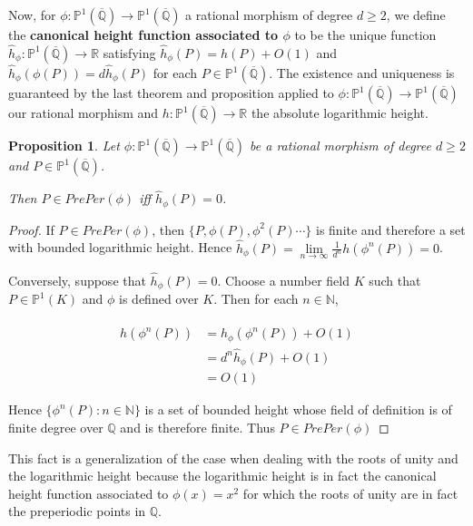 \documentclass{amsart}
\newtheorem{prop}[thm]{Proposition}
\newcommand{\R}{\mathbb{R}}
\newcommand{\N}{\mathbb{N}}
\newcommand{\Q}{\mathbb{Q}}
\renewcommand{\P}{\mathbb{P}}
\begin{document}
Now, for $\phi: \P^1(\overline{\Q}) \rightarrow \P^1(\overline{\Q})$ a rational morphism of degree $d \geq 2$, we define the \textbf{canonical height function associated to $\phi$} to be the unique function $\hat{h}_\phi: \P^1(\overline{\Q}) \rightarrow \R$ satisfying 
$\hat{h}_\phi(P) = h(P) + O(1)$ and $\hat{h}_\phi(\phi(P)) =  d\hat{h}_\phi(P)$ for each $P \in \P^1(\overline{\Q})$. The existence and 
uniqueness is guaranteed by the last theorem and proposition applied to $\phi: \P^1(\overline{\Q}) \rightarrow \P^1(\overline{\Q})$ our rational morphism and $h:\P^1(\overline{\Q}) \rightarrow \R$ the absolute logarithmic height.

\begin{prop}

Let $\phi: \P^1(\overline{\Q}) \rightarrow \P^1(\overline{\Q})$ be a rational morphism of degree $d \geq 2$ and $P \in \P^1(\overline{\Q})$. 

Then $P \in PrePer(\phi)$ iff $\hat{h}_\phi(P) = 0$.

\end{prop}

\begin{proof}

If $P \in PrePer(\phi)$, then $\{P, \phi(P), \phi^2(P) \cdots\}$ is finite and therefore a set with bounded logarithmic height. Hence 
$\hat{h}_\phi(P) = \lim\limits_{n \rightarrow \infty}\frac{1}{d^n} h(\phi^n(P)) = 0$.

Conversely, suppose that $\hat{h}_\phi(P) = 0$. Choose a number field $K$ such that $P \in \P^1(K)$ and $\phi$ is defined over $K$. Then for each $n \in \N$, 

\begin{align*}
h(\phi^n(P)) 
&= \hat{h}_\phi(\phi^n(P)) + O(1)\\
&= d^n\hat{h}_\phi(P) + O(1)\\
&= O(1)
\end{align*}

Hence $\{\phi^n(P):n \in \N\}$ is a set of bounded height whose field of definition is of finite degree over $\Q$ and is therefore finite. Thus $P \in PrePer(\phi)$ 

\end{proof}

This fact is a generalization of the case when dealing with the roots of unity and the logarithmic height because the logarithmic height is in fact the canonical height function associated to $\phi(x) = x^2$ for which the roots of unity are in fact the preperiodic points in $\Q$. 
\end{document}
